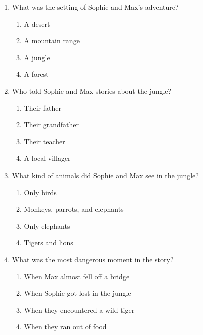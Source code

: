 \documentclass[12pt]{article}
\begin{document}
\begin{enumerate}

    \item What was the setting of Sophie and Max’s adventure?

    \begin{enumerate}[label=\Alph*.]
        \item A desert
        \item A mountain range
        \item A jungle
        \item A forest
    \end{enumerate}
    
    \vspace{0.5cm}

    \item Who told Sophie and Max stories about the jungle?

    \begin{enumerate}[label=\Alph*.]
        \item Their father
        \item Their grandfather
        \item Their teacher
        \item A local villager
    \end{enumerate}
    
    \vspace{0.5cm}

    \item What kind of animals did Sophie and Max see in the jungle?

    \begin{enumerate}[label=\Alph*.]
        \item Only birds
        \item Monkeys, parrots, and elephants
        \item Only elephants
        \item Tigers and lions
    \end{enumerate}
    
    \vspace{0.5cm}

    \item What was the most dangerous moment in the story?

    \begin{enumerate}[label=\Alph*.]
        \item When Max almost fell off a bridge
        \item When Sophie got lost in the jungle
        \item When they encountered a wild tiger
        \item When they ran out of food
    \end{enumerate}
    

\end{enumerate}
\end{document}
